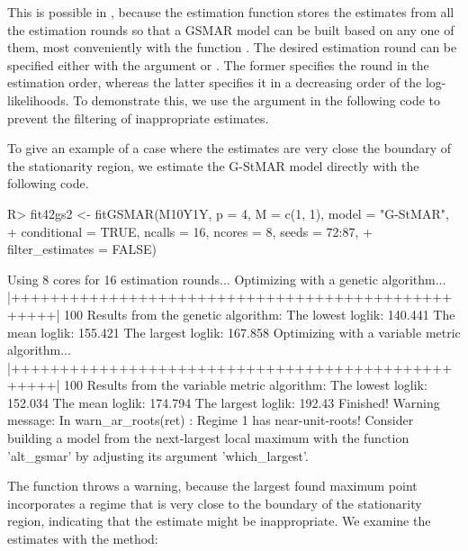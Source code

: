 \documentclass[nojss]{jss} %
\begin{document}
This is possible in , because the estimation function  stores the estimates from all the estimation rounds so that a GSMAR model can be built based on any one of them, most conveniently with the function . The desired estimation round can be specified either with the argument  or . The former specifies the round in the estimation order, whereas the latter specifies it in a decreasing order of the log-likelihoods. To demonstrate this, we use the argument  in the following code to prevent the filtering of inappropriate estimates.

To give an example of a case where the estimates are very close the boundary of the stationarity region, we estimate the G-StMAR model directly with the following code.
%
\begin{CodeChunk}
\begin{CodeInput}
R> fit42gs2 <- fitGSMAR(M10Y1Y, p = 4, M = c(1, 1), model = "G-StMAR",
+    conditional = TRUE, ncalls = 16, ncores = 8, seeds = 72:87,
+    filter_estimates = FALSE)
\end{CodeInput}
\begin{CodeOutput}
Using 8 cores for 16 estimation rounds...
Optimizing with a genetic algorithm...
  |++++++++++++++++++++++++++++++++++++++++++++++++++| 100%
Results from the genetic algorithm:
The lowest loglik:  140.441
The mean loglik:    155.421
The largest loglik: 167.858
Optimizing with a variable metric algorithm...
  |++++++++++++++++++++++++++++++++++++++++++++++++++| 100%
Results from the variable metric algorithm:
The lowest loglik:  152.034
The mean loglik:    174.794
The largest loglik: 192.43
Finished!
Warning message:
In warn_ar_roots(ret) :
  Regime 1 has near-unit-roots! Consider building a model from the next-largest
  local maximum with the function 'alt_gsmar' by adjusting its argument
  'which_largest'.
\end{CodeOutput}
\end{CodeChunk}
%
The function throws a warning, because the largest found maximum point incorporates a regime that is very close to the boundary of the stationarity region, indicating that the estimate might be inappropriate.
We examine the estimates with the  method:
%
\end{document}
